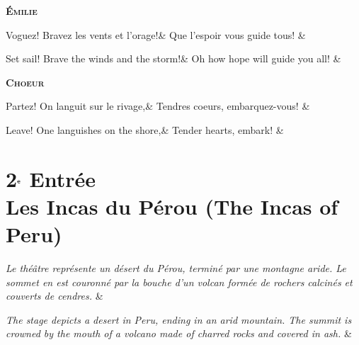 \documentclass{article}
\newcommand{\accentcolr}{\color{WildStrawberry}}
\newcommand{\spotcolr}[1]{{\accentcolr#1}}
\newcommand{\secheadr}[1]{\rhead{\parbox{\marginparwidth}{\sffamily\spotcolr{#1}}}\thispagestyle{plain}}
\newcommand{\dialogue}[1]{%
    \filbreak\begin{center}
	    \textbf{\textsc{#1}}
    \end{center}\nopagebreak}
\newcommand{\scene}[1]{\emph{#1}\hfill}
\begin{document}
\dialogue{\'{E}milie}
\begin{pairs}
\begin{Leftside}
	\stanza
        Voguez! Bravez les vents et l'orage!&
		Que l'espoir vous guide tous!
    \& 
    \endnumbering
\end{Leftside}
\begin{Rightside}
	\stanza
	    Set sail! Brave the winds and the storm!&
		Oh how hope will guide you all!
    \& 
    \endnumbering
\end{Rightside} 
\Columns 
\end{pairs}

\dialogue{Choeur}
\begin{pairs}
\begin{Leftside}
	\stanza
		Partez! On languit sur le rivage,&
		Tendres coeurs, embarquez-vous!
    \& 
    \endnumbering
\end{Leftside}
\begin{Rightside}
	\stanza
		Leave! One languishes on the shore,&
		Tender hearts, embark!
    \& 
    \endnumbering
\end{Rightside} 
\Columns 
\end{pairs}






\newpage

\section*{2$^{\textrm{\sffamily{e}}}$ Entr\'{e}e \\ Les Incas du P\'{e}rou (The Incas of Peru)}\secheadr{Act 2}

\begin{pairs}
\begin{Leftside}
	\stanza
		\scene{Le th\'{e}\^{a}tre repr\'{e}sente un d\'{e}sert du P\'{e}rou, termin\'{e} par une montagne aride. Le sommet en est couronn\'{e} par la bouche d'un volcan form\'{e}e de rochers calcin\'{e}s et couverts de cendres.}
	\& 
	\endnumbering
\end{Leftside}
\begin{Rightside}
	\stanza
		\scene{The stage depicts a desert in Peru, ending in an arid mountain. The summit is crowned by the mouth of a volcano made of charred rocks and covered in ash.}
	\&
	\endnumbering
\end{Rightside} 
\Columns 
\end{pairs}
\end{document}
